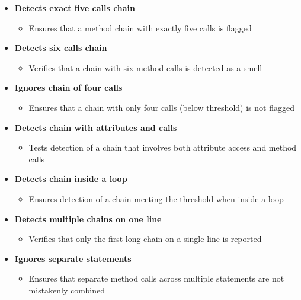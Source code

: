 \documentclass[12pt, titlepage]{article}
\begin{document}
  \begin{itemize}
    \item \textbf{Detects exact five calls chain}
        \begin{itemize}
        \item Ensures that a method chain with exactly five calls is flagged
        \end{itemize}

    \item \textbf{Detects six calls chain}
        \begin{itemize}
        \item Verifies that a chain with six method calls is detected as a smell
        \end{itemize}

    \item \textbf{Ignores chain of four calls}
        \begin{itemize}
        \item Ensures that a chain with only four calls (below threshold) is not flagged
        \end{itemize}

    \item \textbf{Detects chain with attributes and calls}
        \begin{itemize}
        \item Tests detection of a chain that involves both attribute access and method calls
        \end{itemize}

    \item \textbf{Detects chain inside a loop}
        \begin{itemize}
        \item Ensures detection of a chain meeting the threshold when inside a loop
        \end{itemize}

    \item \textbf{Detects multiple chains on one line}
        \begin{itemize}
        \item Verifies that only the first long chain on a single line is reported
        \end{itemize}

    \item \textbf{Ignores separate statements}
        \begin{itemize}
        \item Ensures that separate method calls across multiple statements are not mistakenly combined
        \end{itemize}


\end{itemize}
\end{document}
